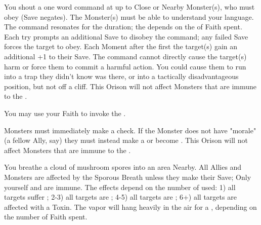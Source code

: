 \begin{multicols*}{2}
You shout a one word command at up to \DICE Close or Nearby Monster(s), who must obey (Save negates).  The Monster(s) must be able to understand your language.  The command resonates for the duration; the \Duration depends on the \DICE of Faith spent.  Each \Duration try prompts an additional Save to disobey the command; any failed Save forces the target to obey. Each Moment after the first the target(s) gain an additional +1 to their Save.  The command cannot directly cause the target(s) harm or force them to commit a harmful action.  You could cause them to run into a trap they didn't know was there, or into a tactically disadvantageous position, but not off a cliff. This Orison will not affect Monsters that are immune to the .

\LITURGY [
  Name = Scourge of Chaos,
  Link = arcana-mystery-scourge-of-chaos,
  Paradigm = Righteous,
  Duration=1 Combat Action
]

You may use your Faith to invoke the .

\LITURGY [
  Name = Spook,
  Link = arcana-mystery-spook,
  Paradigm = Cunning,
  Duration=1 Combat Action
]

\DICE Monsters must immediately make a  check. If the Monster does not have "morale" (a fellow Ally, say) they must instead make a  or become . This Orison will not affect Monsters that are immune to the .

\LITURGY [
  Name = Sporous Vapor,
  Link = arcana-mystery-sporous-vapor,
  Paradigm = Heathen,
  Duration=1 Combat Action
]

You breathe a cloud of mushroom spores into an area Nearby.  All Allies and Monsters are affected by the Sporous Breath unless they make their Save; Only yourself and  are immune.  The effects depend on the number of \DICE used: 1) all targets suffer ; 2-3) all targets are ; 4-5) all targets are ; 6+) all targets are affected with a  Toxin. The vapor will hang heavily in the air for a \Duration, depending on the number of Faith spent.

\newpage

\LITURGY [
  Name = Vile Hunger,
  Link = arcana-mystery-vile-hunger,
  Paradigm = Ruinous,
  Duration=1 Combat Action
]


\end{multicols*}
